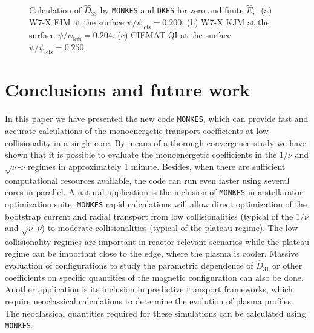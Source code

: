 \documentclass[10pt]{iopart}
\newcommand{\MONKES}{{\texttt{MONKES}}}
\begin{document}
\begin{figure}[h]
\begin{subfigure}[t]{0.32\textwidth}
%		
		\caption{}
		\label{subfig:D33_Benchmark_CIEMAT_QI}
	\end{subfigure}
	\caption{Calculation of $\widehat{D}_{33}$ by \texttt{MONKES} and \texttt{DKES} for zero and finite $\widehat{E}_r$. (a) W7-X EIM at the surface $\psi /\psi_{\text{lcfs}}=0.200$. (b) W7-X KJM at the surface $\psi /\psi_{\text{lcfs}}=0.204$. (c) CIEMAT-QI at the surface $\psi /\psi_{\text{lcfs}}=0.250$.}
	\label{fig:D33_Benchmark}
\end{figure}



\section{Conclusions and future work}
\label{sec:Conclusions}
In this paper we have presented the new code {\MONKES}, which can provide fast and accurate calculations of the monoenergetic transport coefficients at low collisionality in a single core. By means of a thorough convergence study we have shown that it is possible to evaluate the monoenergetic coefficients in the $1/\nu$ and $\sqrt{\nu}$-$\nu$ regimes in approximately 1 minute. Besides, when there are sufficient computational resources available, the code can run even faster using several cores in parallel. A natural application is the inclusion of {\MONKES} in a stellarator optimization suite. {\MONKES} rapid calculations will allow direct optimization of the bootstrap current and radial transport from low collisionalities (typical of the $1/\nu$ and $\sqrt{\nu}$-$\nu$) to moderate collisionalities (typical of the plateau regime). The low collisionality regimes are important in reactor relevant scenarios while the plateau regime can be important close to the edge, where the plasma is cooler. Massive evaluation of configurations to study the parametric dependence of $\widehat{D}_{31}$ or other coefficients on specific quantities of the magnetic configuration can also be done. Another application is its inclusion in predictive transport frameworks, which require neoclassical calculations to determine the evolution of plasma profiles. The neoclassical quantities required for these simulations can be calculated using {\MONKES}.
\end{document}
